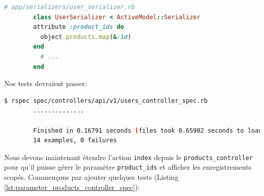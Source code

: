 \documentclass[]{report}
\begin{document}
      \begin{scriptsize}
        \begin{lstlisting}[language=ruby, caption={Implémentation pour inclures les identifiants des produits dans l'objet de l'utilisateur}, label={lst:product_ids_users_controller}]
        # app/serializers/user_serializer.rb
        class UserSerializer < ActiveModel::Serializer
        attribute :product_ids do
          object.products.map(&:id)
        end
          # ...
        end
        \end{lstlisting}
      \end{scriptsize}

      Nos tests devraient passer:

      \begin{scriptsize}
        \begin{lstlisting}[language=bash]
        $ rspec spec/controllers/api/v1/users_controller_spec.rb
        ..............

        Finished in 0.16791 seconds (files took 0.65902 seconds to load)
        14 examples, 0 failures
        \end{lstlisting}
      \end{scriptsize}

      Nous devons maintenant étendre l'action \verb|index| depuis le \verb|products_controller| pour qu'il puisse gérer le paramètre \verb|product_ids| et afficher les enregistrements scopés. Commençons par ajouter quelques tests (Listing \ref{lst:parameter_products_controller_spec}):
\end{document}
